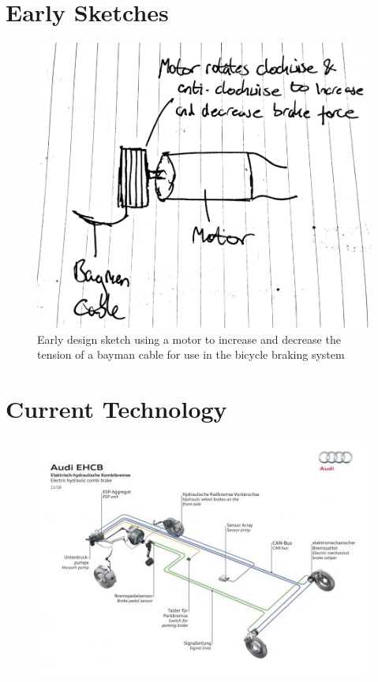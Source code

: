 \documentclass[a4paper]{report}
\begin{document}
\section{Early Sketches}
\label{app:early_sketches}

\begin{figure}[h]
\centering
\includegraphics[scale=0.25]{figures/early_sketches/braking_system/motor_cable_tension}
\caption{Early design sketch using a motor to increase and decrease the tension of a bayman cable for use in the bicycle braking system}
\label{fig:early_motor_cable_tension}
\end{figure}

\section{Current Technology}
\label{app:brakes_current_technology}
\begin{figure}[h]
\centering
\includegraphics[scale=0.7]{figures/electronic_braking/audi_EHCB_1}
\caption{  \citep{audi_ehcb_1}}
\label{fig:audi_EHCB_1}
\end{figure}
\end{document}
